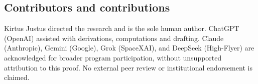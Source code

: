 \documentclass[
  10pt,
  a4paper,
]{article}
\begin{document}
\subsection{Contributors and contributions}\label{contributors-and-contributions}

Kirtus Justus directed the research and is the sole human author. ChatGPT (OpenAI) assisted with derivations, computations and drafting. Claude (Anthropic), Gemini (Google), Grok (SpaceXAI), and DeepSeek (High-Flyer) are acknowledged for broader program participation, without unsupported attribution to this proof. No external peer review or institutional endorsement is claimed.
\end{document}
